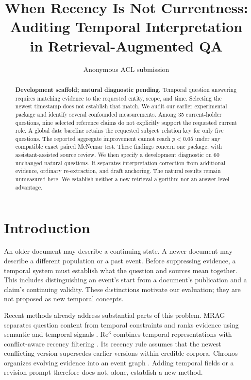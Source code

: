 \documentclass[11pt]{article}
\title{When Recency Is Not Currentness:\\Auditing Temporal Interpretation in Retrieval-Augmented QA}
\author{Anonymous ACL submission}
\begin{document}
\maketitle
\begin{abstract}
\textbf{Development scaffold; natural diagnostic pending.}
Temporal question answering requires matching evidence to the requested entity, scope, and time.
Selecting the newest timestamp does not establish that match.
We audit our earlier experimental package and identify several confounded measurements.
Among 35 current-holder questions, nine selected reference claims do not explicitly support the requested current role.
A global date baseline retains the requested subject--relation key for only five questions.
The reported aggregate improvement cannot reach $p<0.05$ under any compatible exact paired McNemar test.
These findings concern one package, with assistant-assisted source review.
We then specify a development diagnostic on 60 unchanged natural questions.
It separates interpretation correction from additional evidence, ordinary re-extraction, and draft anchoring.
The natural results remain unmeasured here.
We establish neither a new retrieval algorithm nor an answer-level advantage.
\end{abstract}

\section{Introduction}

An older document may describe a continuing state.
A newer document may describe a different population or a past event.
Before suppressing evidence, a temporal system must establish what the question and sources mean together.
This includes distinguishing an event's start from a document's publication and a claim's continuing validity.
These distinctions motivate our evaluation; they are not proposed as new temporal concepts.

Recent methods already address substantial parts of this problem.
MRAG separates question content from temporal constraints and ranks evidence using semantic and temporal signals \citep{zhang2025mrag}.
Re$^3$ combines temporal representations with conflict-aware recency filtering \citep{cao2026re3}.
Its recency rule assumes that the newest conflicting version supersedes earlier versions within credible corpora.
Chronos organizes evolving evidence into an event graph \citep{liu2026chronos}.
Adding temporal fields or a revision prompt therefore does not, alone, establish a new method.
\end{document}
